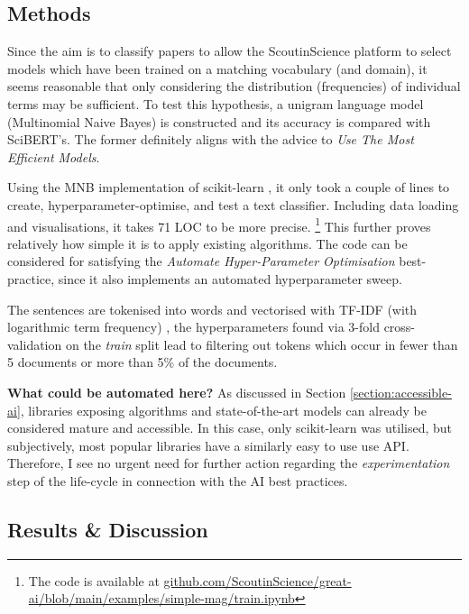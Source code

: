 \subsection{Methods}

Since the aim is to classify papers to allow the ScoutinScience platform to select models which have been trained on a matching vocabulary (and domain), it seems reasonable that only considering the distribution (frequencies) of individual terms may be sufficient. To test this hypothesis, a unigram language model (Multinomial Naive Bayes) is constructed and its accuracy is compared with SciBERT's. The former definitely aligns with the advice to \textit{Use The Most Efficient Models}.

Using the MNB implementation of scikit-learn \cite{pedregosa2011scikit}, it only took a couple of lines to create, hyperparameter-optimise, and test a text classifier. Including data loading and visualisations, it takes 71 LOC to be more precise. \footnote{The code is available at \href{https://github.com/ScoutinScience/great-ai/blob/main/examples/simple-mag/train.ipynb}{github.com/ScoutinScience/great-ai/blob/main/examples/simple-mag/train.ipynb}} This further proves relatively how simple it is to apply existing algorithms. The code can be considered for satisfying the \textit{Automate Hyper-Parameter Optimisation} best-practice, since it also implements an automated hyperparameter sweep. 

The sentences are tokenised into words and vectorised with TF-IDF (with logarithmic term frequency) \cite{buckley1985implementation}, the hyperparameters found via 3-fold cross-validation on the \textit{train} split lead to filtering out tokens which occur in fewer than 5 documents or more than 5\% of the documents.

\begin{displayquote}
\textbf{What could be automated here?} As discussed in Section \ref{section:accessible-ai}, libraries exposing algorithms and state-of-the-art models can already be considered mature and accessible. In this case, only scikit-learn was utilised, but subjectively, most popular libraries have a similarly easy to use use API. Therefore, I see no urgent need for further action regarding the \textit{experimentation} step of the life-cycle in connection with the AI best practices.
\end{displayquote}

\subsection{Results \& Discussion}

